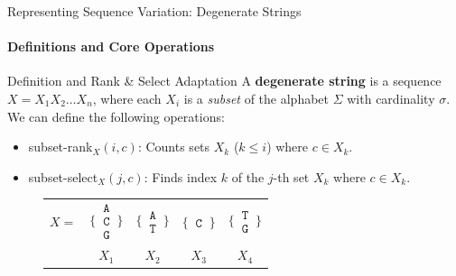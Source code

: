 \begin{frame}{Representing Sequence Variation: Degenerate Strings}
    \framesubtitle{Definitions and Core Operations}
    \begin{block}{Definition and Rank \& Select Adaptation}
        A \textbf{degenerate string} is a sequence $X = X_1 X_2 \dots X_n$, where each $X_i$ is a \emph{subset} of the alphabet $\Sigma$ with cardinality $\sigma$. We can define the following operations:
        \begin{itemize}
            \item \textsf{subset-rank}$_X(i, c)$: Counts sets $X_k$ ($k \le i$) where $c \in X_k$.
            \item \textsf{subset-select}$_X(j, c)$: Finds index $k$ of the $j$-th set $X_k$ where $c \in X_k$.
        \end{itemize}
    \end{block}
    \pause
    \begin{figure}[h!] %
        \centering
        \begin{tabular}{c@{\hskip 0.5em}c@{\hskip 0.5em}c@{\hskip 0.5em}c@{\hskip 0.5em}c}
            $X = $                                                               & $\Bigg\{\,\begin{matrix}\texttt{A}\\\texttt{C}\\\texttt{G}\end{matrix}\,\Bigg\}$ &
            $\Bigg\{\,\begin{matrix}\texttt{A}\\\texttt{T}\end{matrix}\,\Bigg\}$ &
            $\Bigg\{\,\begin{matrix}\texttt{C}\end{matrix}\,\Bigg\}$             &
            $\Bigg\{\,\begin{matrix}\texttt{T}\\\texttt{G}\end{matrix}\,\Bigg\}$                                                                                                            \\
                                                                                 & $X_1$                                                                            & $X_2$ & $X_3$ & $X_4$
        \end{tabular}
\end{figure}
\end{frame}
